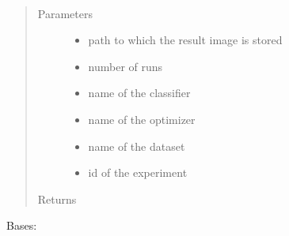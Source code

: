 \documentclass[letterpaper,10pt,english]{sphinxmanual}
\begin{document}
\begin{fulllineitems}
\label{\detokenize{index:plots.plot_tpe}}~\begin{quote}\begin{description}
\item[{Parameters}] \leavevmode\begin{itemize}
\item {} 
 \textendash{} path to which the result image is stored

\item {} 
 \textendash{} number of runs

\item {} 
 \textendash{} name of the classifier

\item {} 
 \textendash{} name of the optimizer

\item {} 
 \textendash{} name of the dataset

\item {} 
 \textendash{} id of the experiment

\end{itemize}

\item[{Returns}] \leavevmode


\end{description}\end{quote}

\end{fulllineitems}

\label{\detokenize{index:module-utils}}

\begin{fulllineitems}
\label{\detokenize{index:utils.Loss}}
Bases: 

\begin{fulllineitems}
\label{\detokenize{index:utils.Loss.evaluate_loss}}
\end{fulllineitems}


\end{fulllineitems}
\end{document}
